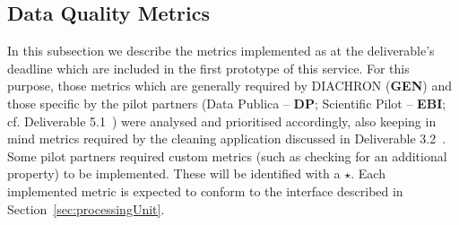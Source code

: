 
\subsection{Data Quality Metrics}
\label{sec:DQMetrics} 
In this subsection we describe the metrics implemented as at the deliverable's deadline which are included in the first prototype of this service.
For this purpose, those metrics which are generally required by DIACHRON (\textbf{GEN}) and those specific by the pilot partners (Data Publica – \textbf{DP};  Scientific Pilot – \textbf{EBI}; cf. Deliverable 5.1~\cite[section 4]{diachron-d5.1}) were analysed and prioritised accordingly, also keeping in mind metrics required by the cleaning application discussed in Deliverable 3.2~\cite{diachron-d3.2}.
Some pilot partners required custom metrics (such as checking for an additional property) to be implemented.
These will be identified with a $\star$.
Each implemented metric is expected to conform to the interface described in Section~\ref{sec:processingUnit}.






